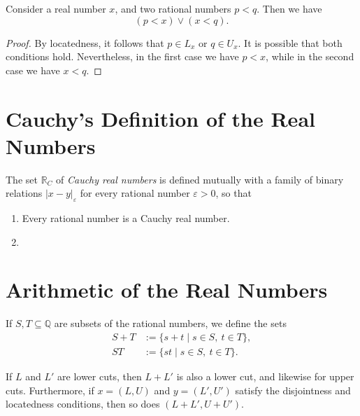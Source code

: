 \begin{proposition}
  Consider a real number $x$, and two rational numbers $p<q$. Then we have
  \begin{equation*}
    (p<x)\lor(x<q).
  \end{equation*}
\end{proposition}

\begin{proof}
  By locatedness, it follows that $p\in L_x$ or $q\in U_x$. It is possible that both conditions hold. Nevertheless, in the first case we have $p<x$, while in the second case we have $x<q$.
\end{proof}

\section{Cauchy's Definition of the Real Numbers}

\begin{definition}
  The set $\mathbb{R}_C$ of \emph{Cauchy real numbers} is defined mutually with a family of binary relations $|x-y|_{\varepsilon}$ for every rational number $\varepsilon>0$, so that
  \begin{enumerate}
  \item Every rational number is a Cauchy real number.
  \item 
  \end{enumerate}
\end{definition}

\section{Arithmetic of the Real Numbers}

\begin{definition}
  If $S,T\subseteq \mathbb{Q}$ are subsets of the rational numbers, we define the sets
  \begin{align*}
    S+T & := \{s+t\mid s\in S,~t\in T\},\\
    ST & := \{st \mid s\in S,~t\in T\}.
  \end{align*}
\end{definition}

\begin{proposition}
  If $L$ and $L'$ are lower cuts, then $L+L'$ is also a lower cut, and likewise for upper cuts. Furthermore, if $x=(L,U)$ and $y=(L',U')$ satisfy the disjointness and locatedness conditions, then so does $(L+L',U+U')$.
\end{proposition}

